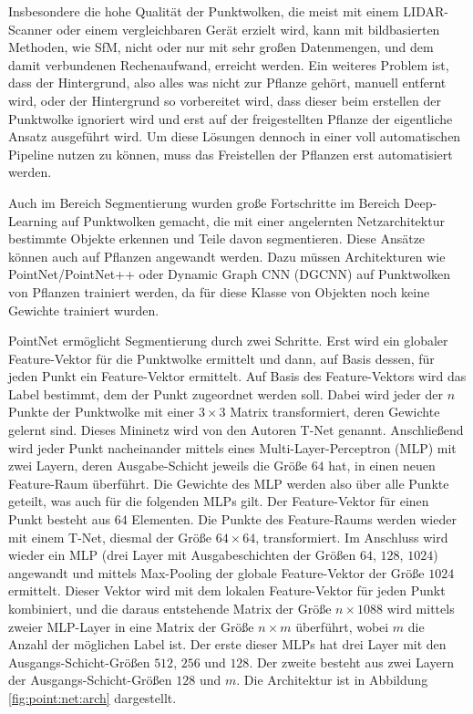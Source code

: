 \documentclass[12pt,titlepage, twoside]{article}
\begin{document}
Insbesondere die hohe Qualität der Punktwolken, die meist mit einem LIDAR-Scanner oder einem vergleichbaren Gerät erzielt wird, 
kann mit bildbasierten Methoden, wie SfM, nicht oder nur mit sehr großen Datenmengen, und dem damit verbundenen Rechenaufwand, erreicht werden. 
Ein weiteres Problem ist, dass der Hintergrund, also alles was nicht zur Pflanze gehört, manuell entfernt wird, 
oder der Hintergrund so vorbereitet wird, dass dieser beim erstellen der Punktwolke ignoriert wird und erst auf der freigestellten Pflanze der eigentliche Ansatz ausgeführt wird. 
Um diese Lösungen dennoch in einer voll automatischen Pipeline nutzen zu können, muss das Freistellen der Pflanzen erst automatisiert werden.

Auch im Bereich Segmentierung wurden große Fortschritte im Bereich Deep-Learning auf Punktwolken gemacht, die mit einer angelernten Netzarchitektur bestimmte Objekte erkennen und Teile davon segmentieren. 
Diese Ansätze können auch auf Pflanzen angewandt werden. Dazu müssen Architekturen wie PointNet\cite{qi2017pointnet}/PointNet++\cite{qi2017pointnet++} oder Dynamic Graph CNN (DGCNN) \cite{dgcnn} auf Punktwolken von Pflanzen trainiert werden, 
da für diese Klasse von Objekten noch keine Gewichte trainiert wurden.

PointNet ermöglicht Segmentierung durch zwei Schritte. Erst wird ein globaler Feature-Vektor für die Punktwolke ermittelt und dann, auf Basis dessen, für jeden Punkt ein Feature-Vektor ermittelt.
Auf Basis des Feature-Vektors wird das Label bestimmt, dem der Punkt zugeordnet werden soll. 
Dabei wird jeder der $n$ Punkte der Punktwolke mit einer $3\times 3$ Matrix transformiert, deren Gewichte gelernt sind. Dieses Mininetz wird von den Autoren T-Net genannt.
Anschließend wird jeder Punkt nacheinander mittels eines Multi-Layer-Perceptron (MLP) mit zwei Layern, deren Ausgabe-Schicht jeweils die Größe $64$ hat, in einen neuen Feature-Raum überführt. 
Die Gewichte des MLP werden also über alle Punkte geteilt, was auch für die folgenden MLPs gilt. Der Feature-Vektor für einen Punkt besteht aus $64$ Elementen.
Die Punkte des Feature-Raums werden wieder mit einem T-Net, diesmal der Größe $64\times 64$, transformiert. 
Im Anschluss wird wieder ein MLP (drei Layer mit Ausgabeschichten der Größen $64$, $128$, $1024$) angewandt und mittels Max-Pooling der globale Feature-Vektor der Größe $1024$ ermittelt. 
Dieser Vektor wird mit dem lokalen Feature-Vektor für jeden Punkt kombiniert, und die daraus entstehende Matrix der Größe $n\times 1088$ wird mittels zweier MLP-Layer in eine Matrix der Größe $n\times m$ überführt, wobei $m$ die Anzahl der möglichen Label ist.
Der erste dieser MLPs hat drei Layer mit den Ausgangs-Schicht-Größen $512$, $256$ und $128$. Der zweite besteht aus zwei Layern der Ausgangs-Schicht-Größen $128$ und $m$.
Die Architektur ist in Abbildung \ref{fig:point:net:arch} dargestellt.
\end{document}
